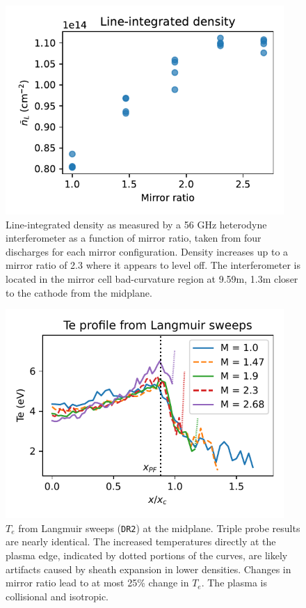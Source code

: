 \begin{figure}
    \centering
    \includegraphics[width=300pt]{figures/fig4.pdf}
    \caption[Line-integrated density]{Line-integrated density as measured by a 56 GHz heterodyne interferometer as a function of mirror ratio, taken from four discharges for each mirror configuration. Density increases up to a mirror ratio of 2.3 where it appears to level off. The interferometer is located in the mirror cell bad-curvature region at 9.59m, 1.3m closer to the cathode from the midplane.}
    \label{fig:density-line}
\end{figure}

\begin{figure}
    \centering
    \includegraphics[width=300pt]{figures/fig5.pdf}
    \caption[$T_e$ from Langmuir sweeps at the midplane]{$T_e$ from Langmuir sweeps (\texttt{DR2}) at the midplane. Triple probe results are nearly identical. The increased temperatures directly at the plasma edge, indicated by dotted portions of the curves, are likely artifacts caused by sheath expansion in lower densities. Changes in mirror ratio lead to at most 25\% change in $T_e$. The plasma is collisional and isotropic.}
    \label{fig:Te-sweeps}
\end{figure}

